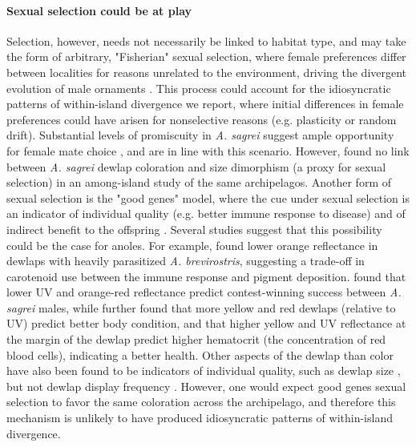 \paragraph{Sexual selection could be at play} Selection, however, needs not necessarily be linked to habitat type, and may take the form of arbitrary, "Fisherian" sexual selection, where female preferences differ between localities for reasons unrelated to the environment, driving the divergent evolution of male ornaments \citep{Andersson1994}. This process could account for the idiosyncratic patterns of within-island divergence we report, where initial differences in female preferences could have arisen for nonselective reasons (e.g. plasticity or random drift). Substantial levels of promiscuity in \textit{A. sagrei} suggest ample opportunity for female mate choice \citep{Kamath2018}, and are in line with this scenario. However, \citet{Baeckens2018} found no link between \textit{A. sagrei} dewlap coloration and size dimorphism (a proxy for sexual selection) in an among-island study of the same archipelagos. Another form of sexual selection is the "good genes" model, where the cue under sexual selection is an indicator of individual quality (e.g. better immune response to disease) and of indirect benefit to the offspring \citep{Andersson1994}. Several studies suggest that this possibility could be the case for anoles. For example, \citet{Cook2013} found lower orange reflectance in dewlaps with heavily parasitized \textit{A. brevirostris}, suggesting a trade-off in carotenoid use between the immune response and pigment deposition. \citet{Steffen2014} found that lower UV and orange-red reflectance predict contest-winning success between \textit{A. sagrei} males, while \citet{Driessens2015} further found that more yellow and red dewlaps (relative to UV) predict better body condition, and that higher yellow and UV reflectance at the margin of the dewlap predict higher hematocrit (the concentration of red blood cells), indicating a better health. Other aspects of the dewlap than color have also been found to be indicators of individual quality, such as dewlap size \citep{Vanhooydonck2005, Vanhooydonck2009}, but not dewlap display frequency \citep{Tokarz2002, Tokarz2005, Driessens2015}. However, one would expect good genes sexual selection to favor the same coloration across the archipelago, and therefore this mechanism is unlikely to have produced idiosyncratic patterns of within-island divergence.


